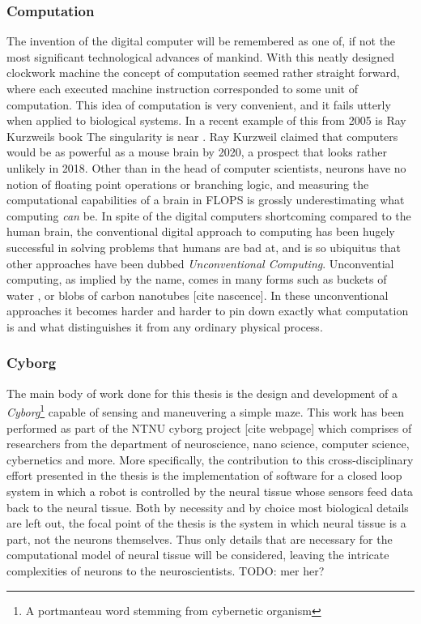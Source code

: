 \subsubsection{Computation}
The invention of the digital computer will be remembered as one of, if not the
most significant technological advances of mankind.
%
With this neatly designed clockwork machine the concept of computation seemed
rather straight forward, where each executed machine instruction corresponded to
some unit of computation.
%
This idea of computation is very convenient, and it fails utterly when
applied to biological systems.
In a recent example of this from 2005 is Ray Kurzweils book The singularity is
near \cite{KURZWEIL2005}.
Ray Kurzweil claimed that computers would be as powerful as a
mouse brain by 2020, a prospect that looks rather unlikely in 2018.
Other than in the head of computer scientists, neurons have no notion of
floating point operations or branching logic, and measuring the computational
capabilities of a brain in FLOPS is grossly underestimating what computing
\emph{can} be.
%
In spite of the digital computers shortcoming compared to the human brain, the
conventional digital approach to computing has been hugely successful in solving
problems that humans are bad at, and is so ubiquitus that other approaches
have been dubbed \emph{Unconventional Computing}.
%
Unconvential computing, as implied by the name, comes in many forms such as
buckets of water \cite{FERNANDO2003}, or blobs of carbon nanotubes
[cite nascence]. 
%
In these unconventional approaches it becomes harder and harder to pin down
exactly what computation is and what distinguishes it from any ordinary physical
process.
%
\subsubsection{Cyborg}
The main body of work done for this thesis is the design and development of a
\emph{Cyborg}\footnote{A portmanteau word stemming from cybernetic organism}
capable of sensing and maneuvering a simple maze.
This work has been performed as part of the NTNU cyborg project [cite webpage]
which comprises of researchers from the department of neuroscience, nano
science, computer science, cybernetics and more.
More specifically, the contribution to this cross-disciplinary effort presented
in the thesis is the implementation of software for a closed loop system in which a
robot is controlled by the neural tissue whose sensors feed data back to the neural
tissue.
Both by necessity and by choice most biological details are left out, the focal
point of the thesis is the system in which neural tissue is a part, not the
neurons themselves.
Thus only details that are necessary for the computational model of neural
tissue will be considered, leaving the intricate complexities of neurons to the
neuroscientists.
TODO: mer her?
\cleardoublepage


